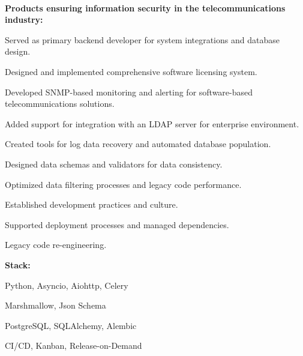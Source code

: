 \documentclass[a4paper]{MagicalCV}
\begin{document}
\begin{minipage}[t]{0.64\textwidth} 


 \\
\vspace{\topsep} %

\textbf{Products ensuring information security in the telecommunications industry:}
\begin{tightemize}
  \item Served as primary backend developer for system integrations and database design.
  \item Designed and implemented comprehensive software licensing system.
  \item Developed SNMP-based monitoring and alerting for software-based telecommunications solutions.
  \item Added support for integration with an LDAP server for enterprise environment.
  \item Created tools for log data recovery and automated database population.
  \item Designed data schemas and validators for data consistency.
  \item Optimized data filtering processes and legacy code performance.
  \item Established development practices and culture.
  \item Supported deployment processes and managed dependencies.
  \item Legacy code re-engineering.
\end{tightemize}

\textbf{Stack:}
\begin{tightemize}
  \item Python, Asyncio, Aiohttp, Celery
  \item Marshmallow, Json Schema
  \item PostgreSQL, SQLAlchemy, Alembic
  \item CI/CD, Kanban, Release-on-Demand
\end{tightemize}
\sectionsep
\vspace{1em}

 \\
\vspace{\topsep} %



\end{minipage}
\end{document}
